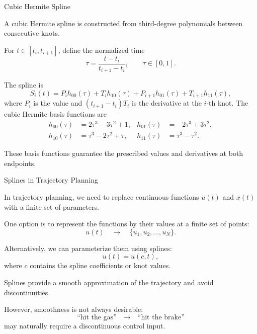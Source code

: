 \documentclass{beamer}
\begin{document}
\begin{frame}{Cubic Hermite Spline}
	\begin{flushleft}
		A cubic Hermite spline is constructed from third-degree
		polynomials between consecutive knots.
		
		\vspace{0.5em}
		
		For $t\in[t_i,t_{i+1}]$, define the normalized time
		\[
		\tau
		=
		\frac{t-t_i}{t_{i+1}-t_i},
		\qquad
		\tau\in[0,1].
		\]
		
		The spline is
		\[
		S_i(t)
		=
		P_i h_{00}(\tau)
		+
		T_i h_{10}(\tau)
		+
		P_{i+1} h_{01}(\tau)
		+
		T_{i+1} h_{11}(\tau),
		\]
		where $P_i$ is the value and $(t_{i+1}-t_i)T_i$ is the derivative
		at the $i$-th knot. The cubic Hermite basis functions are
\[
\begin{aligned}
	h_{00}(\tau) &= 2\tau^3-3\tau^2+1, & h_{01}(\tau) &= -2\tau^3+3\tau^2, \\
	h_{10}(\tau) &= \tau^3-2\tau^2+\tau, & h_{11}(\tau) &= \tau^3-\tau^2.
\end{aligned}
\]

		
		These basis functions guarantee the prescribed values
		and derivatives at both endpoints.
	\end{flushleft}
\end{frame}



\begin{frame}{Splines in Trajectory Planning}
	\begin{flushleft}
		In trajectory planning, we need to replace continuous
		functions $u(t)$ and $x(t)$ with a finite set of parameters.
		
		\vspace{0.5em}
		
		One option is to represent the functions by their values
		at a finite set of points:
		\[
		u(t)
		\quad\longrightarrow\quad
		\{u_1,u_2,\ldots,u_N\}.
		\]
		
		Alternatively, we can parameterize them using splines:
		\[
		u(t)=u(c,t),
		\]
		where $c$ contains the spline coefficients or knot values.
		
		\vspace{0.3em}
		
		Splines provide a smooth approximation of the trajectory
		and avoid discontinuities.
		
		\vspace{0.3em}
		
		However, smoothness is not always desirable:
		\[
		\text{``hit the gas''}
		\quad\longrightarrow\quad
		\text{``hit the brake''}
		\]
		may naturally require a discontinuous control input.
	\end{flushleft}
\end{frame}
\end{document}
